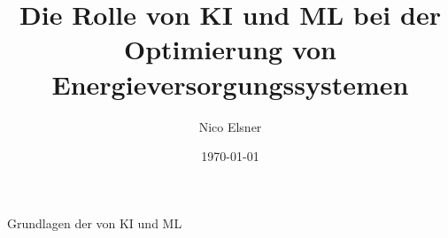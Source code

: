\documentclass{beamer}
\title{Die Rolle von KI und ML bei der Optimierung von Energieversorgungssystemen}
\author{Nico Elsner}
\date{\today}
\begin{document}
    
\begin{frame}
\titlepage
\end{frame}

\begin{frame}{Grundlagen der von KI und ML}
        \begin{figure}
        \centering
        
        \end{figure}
\end{frame}
\end{document}
